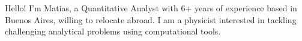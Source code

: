 

\begin{cvparagraph}

Hello! I'm Matias, a Quantitative Analyst with 6+ years of experience based in Buenos Aires, willing to relocate abroad. I am a physicist interested in tackling challenging analytical problems using computational tools.
\end{cvparagraph}

